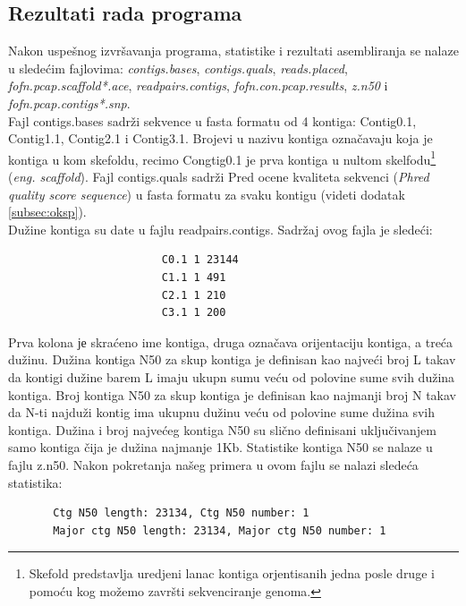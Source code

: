 \documentclass[a4paper]{article}
\begin{document}
{\subsection{Rezultati rada programa}
\label{subsec:rrp}
Nakon uspešnog izvršavanja programa, statistike i rezultati asembliranja se nalaze u sledećim fajlovima: \textit{contigs.bases}, \textit{contigs.quals}, \textit{reads.placed}, \textit{fofn.pcap.scaffold*.ace}, \textit{readpairs.contigs}, \textit{fofn.con.pcap.results}, \textit{z.n50} i \textit{fo\-fn.pcap.contigs*.snp}. \\
Fajl contigs.bases sadrži sekvence u fasta formatu od 4 kontiga: Contig0.1, Contig1.1, Contig2.1 i Contig3.1. Brojevi u nazivu kontiga označavaju koja je kontiga u kom skefoldu, recimo Congtig0.1 je prva kontiga u nultom skelfodu\footnote{Skefold predstavlja uredjeni lanac kontiga orjentisanih jedna posle druge i pomoću kog možemo završti sekvenciranje genoma.} (\textit{eng. scaffold}). Fajl contigs.quals sadrži Pred ocene kvaliteta sekvenci (\textit{Phred quality score sequence}) u fasta formatu za svaku kontigu (videti dodatak \ref{subsec:oksp}). \\Dužine kontiga su date u fajlu readpairs.contigs. Sadržaj ovog fajla je sledeći:
\begin{verbatim}
                        C0.1 1 23144 
                        C1.1 1 491 
                        C2.1 1 210 
                        C3.1 1 200 
\end{verbatim}
Prva kolona је skraćeno ime kontiga, druga označava orijentaciju kontiga, a treća dužinu. Dužina kontiga N50 za skup kontiga je definisan kao najveći broj L takav da kontigi dužine barem L imaju ukupn sumu veću od polovine sume svih dužina kontiga. Broj kontiga N50 za skup kontiga je definisan kao najmanji broj N takav da N-ti najduži kontig ima ukupnu dužinu veću od polovine sume dužina svih kontiga. Dužina i broj najvećeg kontiga N50 su slično definisani uključivanjem samo kontiga čija je dužina najmanje 1Kb. Statistike kontiga N50 se nalaze u fajlu z.n50. Nakon pokretanja našeg primera u ovom fajlu se nalazi sledeća statistika:
\begin{verbatim}
       Ctg N50 length: 23134, Ctg N50 number: 1
       Major ctg N50 length: 23134, Major ctg N50 number: 1
\end{verbatim}

}
\end{document}
